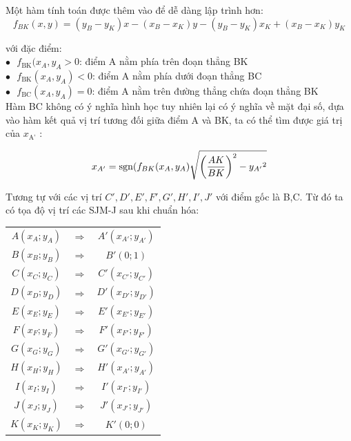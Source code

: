 Một hàm tính toán được thêm vào để dễ dàng lập trình hơn:
\begin{equation}
{f_{BK}}(x,y) = ({y_B} - {y_K})x - ({x_B} - {x_K})y - ({y_B} - {y_K}){x_K} + ({x_B} - {x_K}){y_K}
\end{equation}

với đặc điểm:\\

$\bullet \text{   }  f_\text{BK}(x_A,y_A > 0$: điểm A nằm phía trên đoạn thẳng BK\\

$\bullet \text{   }  f_\text{BK}(x_A,y_A)< 0$: điểm A nằm phía dưới đoạn thẳng BC\\

$\bullet \text{   } f_\text{BC}(x_A,y_A)= 0$: điểm A nằm trên đường thẳng chứa đoạn thẳng BK\\

Hàm BC không có ý nghĩa hình học tuy nhiên lại có ý nghĩa về mặt đại số, dựa vào hàm kết quả vị trí tương đối giữa điểm A và BK, ta có thể tìm được giá trị của $x_\text{A'}$ :

\begin{equation}
{x_{A'}} = {\mathop{\rm sgn}} ({f_{BK}}({x_A},{y_A})\sqrt {{{\left( {\frac{{AK}}{{BK}}} \right)}^2} - {y_{A'}}^2} 
\end{equation}

Tương tự với các vị trí $C', D', E', F', G' , H' , I' , J'$ với điểm gốc là B,C. Từ đó ta có tọa độ vị trí các SJM-J sau khi chuẩn hóa:\*

\begin{tabular}{c c c}
$A(x_A; y_A)$ & $\Rightarrow$ & $A'(x_{A'}; y_{A'})$ \\ 
$B(x_B; y_B)$ & $\Rightarrow$ & $B'(0;1)$ \\ 
$C(x_C; y_C)$ & $\Rightarrow$ & $C'(x_{C'}; y_{C'})$ \\ 
$D(x_D; y_D)$ & $\Rightarrow$ & $D'(x_{D'}; y_{D'})$ \\ 
$E(x_E; y_E)$ & $\Rightarrow$ & $E'(x_{E'}; y_{E'})$ \\ 
$F(x_F; y_F)$ & $\Rightarrow$ & $F'(x_{F'}; y_{F'})$ \\ 
$G(x_G; y_G)$ & $\Rightarrow$ & $G'(x_{G'}; y_{G'})$ \\ 
$H(x_H; y_H)$ & $\Rightarrow$ & $H'(x_{A'}; y_{A'})$ \\ 
$I(x_I; y_I)$ & $\Rightarrow$ & $I'(x_{I'}; y_{I'})$ \\ 
$J(x_J; y_J)$ & $\Rightarrow$ & $J'(x_{J'}; y_{J'})$ \\ 
$K(x_K; y_K)$ & $\Rightarrow$ & $K'(0;0)$ \\ 
\end{tabular} \*

